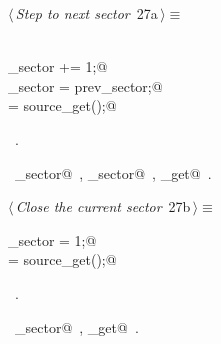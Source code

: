 \documentclass[a4paper]{report}
\begin{document}
\begin{flushleft} \small
\begin{minipage}{\linewidth}\label{scrap40}\raggedright\small
{} $\langle\,${\it Step to next sector}\nobreak\ {\footnotesize {27a}}$\,\rangle\equiv$
\vspace{-1ex}
\begin{list}{}{} \item
\mbox{}\verb@@\\
\mbox{}\verb@prev_sector += 1;@\\
\mbox{}\verb@current_sector = prev_sector;@\\
\mbox{}\verb@c = source_get();@\\
\mbox{}\verb@@{\NWsep}
\end{list}
\vspace{-1.5ex}
\footnotesize
\begin{list}{}{\setlength{\itemsep}{-\parsep}\setlength{\itemindent}{-\leftmargin}}
\item \NWtxtMacroRefIn\ .
\item \NWtxtIdentsUsed\nobreak\  \verb@current_sector@\nobreak\ , \verb@prev_sector@\nobreak\ , \verb@source_get@\nobreak\ .
\item{}
\end{list}
\end{minipage}\vspace{4ex}
\end{flushleft}
\begin{flushleft} \small
\begin{minipage}{\linewidth}\label{scrap41}\raggedright\small
{} $\langle\,${\it Close the current sector}\nobreak\ {\footnotesize {27b}}$\,\rangle\equiv$
\vspace{-1ex}
\begin{list}{}{} \item
\mbox{}\verb@current_sector = 1;@\\
\mbox{}\verb@c = source_get();@\\
\mbox{}\verb@@{\NWsep}
\end{list}
\vspace{-1.5ex}
\footnotesize
\begin{list}{}{\setlength{\itemsep}{-\parsep}\setlength{\itemindent}{-\leftmargin}}
\item \NWtxtMacroRefIn\ .
\item \NWtxtIdentsUsed\nobreak\  \verb@current_sector@\nobreak\ , \verb@source_get@\nobreak\ .
\item{}
\end{list}
\end{minipage}\vspace{4ex}
\end{flushleft}
\end{document}
